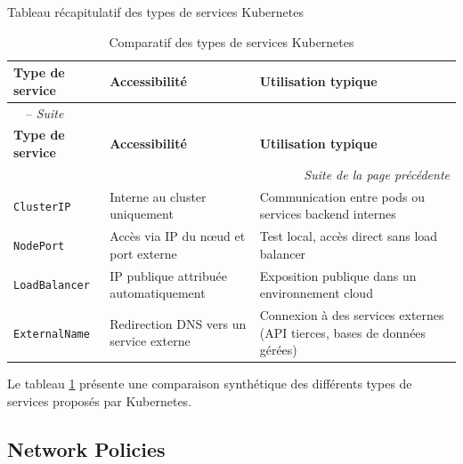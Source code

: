 \bigskip

Tableau récapitulatif des types de services Kubernetes

\begin{longtable}{|p{4cm}|p{5cm}|p{6cm}|}
	\caption{Comparatif des types de services Kubernetes}
	\label{tab:services_k8s}                                                                                                                      \\ \hline
	\textbf{Type de service} & \textbf{Accessibilité}                  & \textbf{Utilisation typique}                                             \\ \hline
	\endfirsthead
	\multicolumn{3}{l}{\tablename\ \thetable\ -- \textit{Suite}}                                                                                  \\ \hline
	\textbf{Type de service} & \textbf{Accessibilité}                  & \textbf{Utilisation typique}                                             \\ \hline
	\endhead
	\hline \multicolumn{3}{r}{\textit{Suite de la page précédente}}                                                                               \\ \hline
	\endfoot
	\hline
	\endlastfoot

	\texttt{ClusterIP}       & Interne au cluster uniquement           & Communication entre pods ou services backend internes                    \\ \hline
	\texttt{NodePort}        & Accès via IP du nœud et port externe    & Test local, accès direct sans load balancer                              \\ \hline
	\texttt{LoadBalancer}    & IP publique attribuée automatiquement   & Exposition publique dans un environnement cloud                          \\ \hline
	\texttt{ExternalName}    & Redirection DNS vers un service externe & Connexion à des services externes (API tierces, bases de données gérées) \\ \hline

\end{longtable}
Le tableau \ref{tab:services_k8s} présente une comparaison synthétique des différents types de services proposés par Kubernetes.

\subsection{Network Policies}

